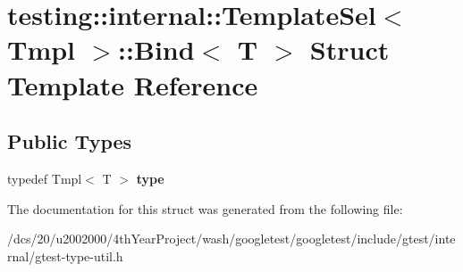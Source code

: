 \hypertarget{structtesting_1_1internal_1_1TemplateSel_1_1Bind}{}\section{testing\+:\+:internal\+:\+:Template\+Sel$<$ Tmpl $>$\+:\+:Bind$<$ T $>$ Struct Template Reference}
\label{structtesting_1_1internal_1_1TemplateSel_1_1Bind}
\subsection*{Public Types}
\begin{DoxyCompactItemize}
\item 
\mbox{\label{structtesting_1_1internal_1_1TemplateSel_1_1Bind_aa84b00f0c4cb97a60d7d8eb752d1956d}} 
typedef Tmpl$<$ T $>$ {\bfseries type}
\end{DoxyCompactItemize}


The documentation for this struct was generated from the following file\+:\begin{DoxyCompactItemize}
\item 
/dcs/20/u2002000/4th\+Year\+Project/wash/googletest/googletest/include/gtest/internal/gtest-\/type-\/util.\+h\end{DoxyCompactItemize}
